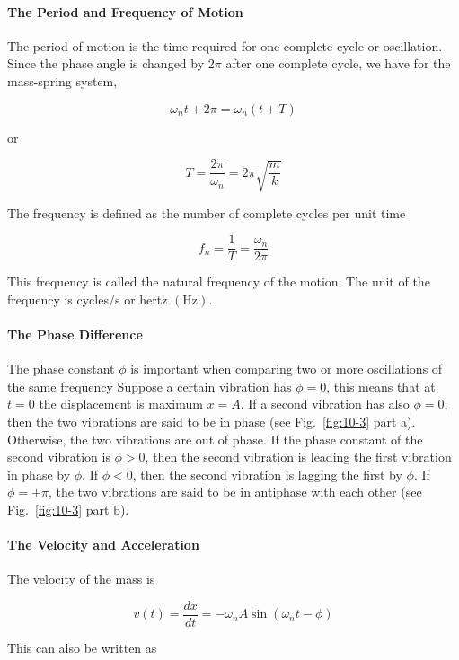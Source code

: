 \documentclass[10pt]{article}
\numberwithin{equation}{section}
\begin{document}
\paragraph{The Period and Frequency of Motion}\label{sec:10-3-1-1}
The period of motion is the time required for one complete cycle or oscillation. Since the phase angle is changed by $2 \pi$ after one complete cycle, we have for the mass-spring system,

$$
\omega_{n} t+2 \pi=\omega_{n}(t+T)
$$

or

$$
T=\frac{2 \pi}{\omega_{n}}=2 \pi \sqrt{\frac{m}{k}}
$$

The frequency is defined as the number of complete cycles per unit time

$$
f_{n}=\frac{1}{T}=\frac{\omega_{n}}{2 \pi}
$$

This frequency is called the natural frequency of the motion. The unit of the frequency is cycles/s or hertz $(\mathrm{Hz})$.

\paragraph{The Phase Difference}\label{sec:10-3-1-2}
The phase constant $\phi$ is important when comparing two or more oscillations of the same frequency Suppose a certain vibration has $\phi=0$, this means that at $t=0$ the displacement is maximum $x=A$. If a second vibration has also $\phi=0$, then the two vibrations are said to be in phase (see Fig.~\ref{fig:10-3} part a). Otherwise, the two vibrations are out of phase. If the phase constant of the second vibration is $\phi>0$, then the second vibration is leading the first vibration in phase by $\phi$. If $\phi<0$, then the second vibration is lagging the first by $\phi$. If $\phi= \pm \pi$, the two vibrations are said to be in antiphase with each other (see Fig.~\ref{fig:10-3} part b).

\paragraph{The Velocity and Acceleration}\label{sec:10-3-1-3}
The velocity of the mass is


\begin{equation}
v(t)=\frac{d x}{d t}=-\omega_{n} A \sin \left(\omega_{n} t-\phi\right) \label{eq:10-4}
\end{equation}


This can also be written as
\end{document}
